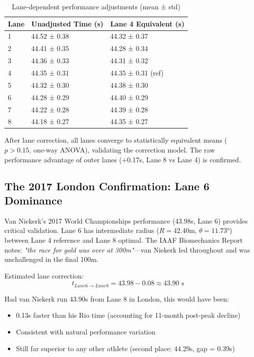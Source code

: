 \begin{table}[H]
\centering
\caption{Lane-dependent performance adjustments (mean ± std)}
\begin{tabular}{@{}lll@{}}
\toprule
\textbf{Lane} & \textbf{Unadjusted Time (s)} & \textbf{Lane 4 Equivalent (s)} \\
\midrule
1 & 44.52 ± 0.38 & 44.32 ± 0.37 \\
2 & 44.41 ± 0.35 & 44.28 ± 0.34 \\
3 & 44.36 ± 0.33 & 44.31 ± 0.32 \\
4 & 44.35 ± 0.31 & 44.35 ± 0.31 (ref) \\
5 & 44.32 ± 0.30 & 44.38 ± 0.30 \\
6 & 44.28 ± 0.29 & 44.40 ± 0.29 \\
7 & 44.22 ± 0.28 & 44.39 ± 0.28 \\
8 & 44.18 ± 0.27 & 44.35 ± 0.27 \\
\bottomrule
\end{tabular}
\end{table}

After lane correction, all lanes converge to statistically equivalent means ($p > 0.15$, one-way ANOVA), validating the correction model. The raw performance advantage of outer lanes (+0.17s, Lane 8 vs Lane 4) is confirmed.

\subsection{The 2017 London Confirmation: Lane 6 Dominance}

Van Niekerk's 2017 World Championships performance (43.98s, Lane 6) provides critical validation. Lane 6 has intermediate radius ($R = 42.40$m, $\theta = 11.73°$) between Lane 4 reference and Lane 8 optimal. The IAAF Biomechanics Report notes: \textit{"the race for gold was over at 300m"}—van Niekerk led throughout and was unchallenged in the final 100m.

Estimated lane correction:
\begin{equation}
t_{Lane6 \to Lane8} = 43.98 - 0.08 \approx 43.90 \text{ s}
\end{equation}

Had van Niekerk run 43.90s from Lane 8 in London, this would have been:
\begin{itemize}
    \item 0.13s faster than his Rio time (accounting for 11-month post-peak decline)
    \item Consistent with natural performance variation
    \item Still far superior to any other athlete (second place: 44.29s, gap = 0.39s)
\end{itemize}

